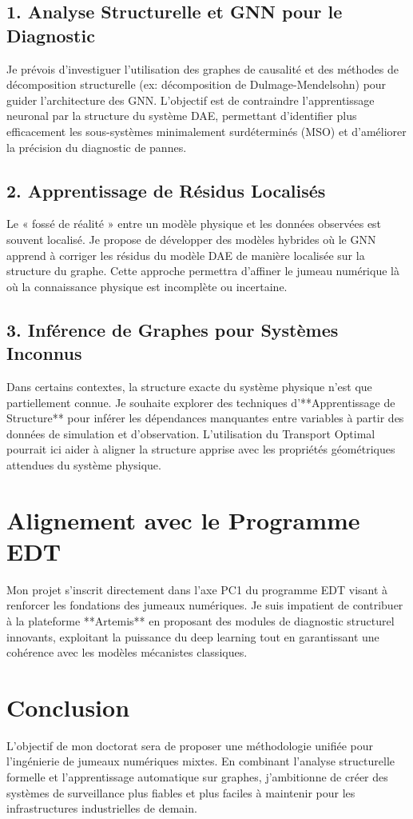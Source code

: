 \documentclass[11pt,a4paper]{article}
\begin{document}
\subsection{1. Analyse Structurelle et GNN pour le Diagnostic}
Je prévois d'investiguer l'utilisation des graphes de causalité et des méthodes de décomposition structurelle (ex: décomposition de Dulmage-Mendelsohn) pour guider l'architecture des GNN. L'objectif est de contraindre l'apprentissage neuronal par la structure du système DAE, permettant d'identifier plus efficacement les sous-systèmes minimalement surdéterminés (MSO) et d'améliorer la précision du diagnostic de pannes.

\subsection{2. Apprentissage de Résidus Localisés}
Le « fossé de réalité » entre un modèle physique et les données observées est souvent localisé. Je propose de développer des modèles hybrides où le GNN apprend à corriger les résidus du modèle DAE de manière localisée sur la structure du graphe. Cette approche permettra d'affiner le jumeau numérique là où la connaissance physique est incomplète ou incertaine.

\subsection{3. Inférence de Graphes pour Systèmes Inconnus}
Dans certains contextes, la structure exacte du système physique n'est que partiellement connue. Je souhaite explorer des techniques d'**Apprentissage de Structure** pour inférer les dépendances manquantes entre variables à partir des données de simulation et d'observation. L'utilisation du Transport Optimal pourrait ici aider à aligner la structure apprise avec les propriétés géométriques attendues du système physique.

\section{Alignement avec le Programme EDT}
Mon projet s'inscrit directement dans l'axe PC1 du programme EDT visant à renforcer les fondations des jumeaux numériques. Je suis impatient de contribuer à la plateforme **Artemis** en proposant des modules de diagnostic structurel innovants, exploitant la puissance du deep learning tout en garantissant une cohérence avec les modèles mécanistes classiques.

\section{Conclusion}
L'objectif de mon doctorat sera de proposer une méthodologie unifiée pour l'ingénierie de jumeaux numériques mixtes. En combinant l'analyse structurelle formelle et l'apprentissage automatique sur graphes, j'ambitionne de créer des systèmes de surveillance plus fiables et plus faciles à maintenir pour les infrastructures industrielles de demain.
\end{document}
